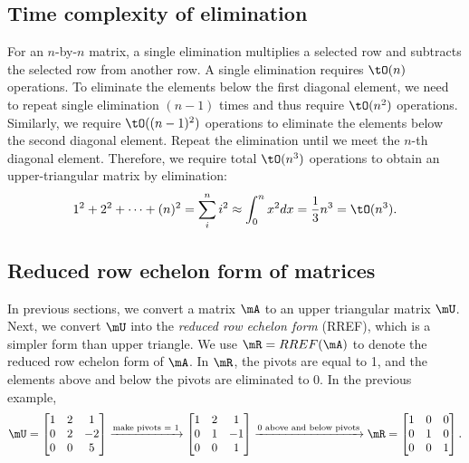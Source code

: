 \documentclass[11pt]{article}
\theoremstyle{plain}
\theoremstyle{definition}
\begin{document}
\subsection{Time complexity of elimination}
For an $n$-by-$n$ matrix, a single elimination multiplies a selected row and subtracts the selected row from another row. A single elimination requires $\tO(n)$ operations. To eliminate the elements below the first diagonal element, we need to repeat single elimination $(n-1)$ times and thus require $\tO(n^2)$ operations. Similarly, we require $\tO((n-1)^2)$ operations to eliminate the elements below the second diagonal element. Repeat the elimination until we meet the $n$-th diagonal element. Therefore, we require total $\tO(n^3)$ operations to obtain an upper-triangular matrix by elimination:
 \[ 1^2 + 2^2 + \cdots +(n)^2 = \sum_{i}^{n} i^2 \approx \int_{0}^{n} x^2 dx = \frac{1}{3} n^3 = \tO(n^3).\]


\subsection{Reduced row echelon form of matrices}
In previous sections, we convert a matrix $\mA$ to an upper triangular matrix $\mU$. Next, we convert $\mU$ into the \textit{reduced row echelon form} (RREF), which is a simpler form than upper triangle. We use $\mR = RREF(\mA)$ to denote the reduced row echelon form of $\mA$. In $\mR$, the pivots are equal to 1, and the elements above and below the pivots are eliminated to 0. In the previous example,
\begin{align}
	\mU = \begin{bmatrix}
		1 &2&1\\0 & 2 & -2\\ 0 & 0 & 5
	\end{bmatrix} \xrightarrow{\text{make pivots = 1}} \begin{bmatrix}
		1 &2&1\\0 & 1 & -1\\ 0 & 0 & 1
	\end{bmatrix} 
	\xrightarrow{\text{0 above and below pivots}} \mR =  \begin{bmatrix}
		1 &0&0\\0 & 1 & 0\\ 0 & 0 & 1
	\end{bmatrix} .
\end{align}
\end{document}
